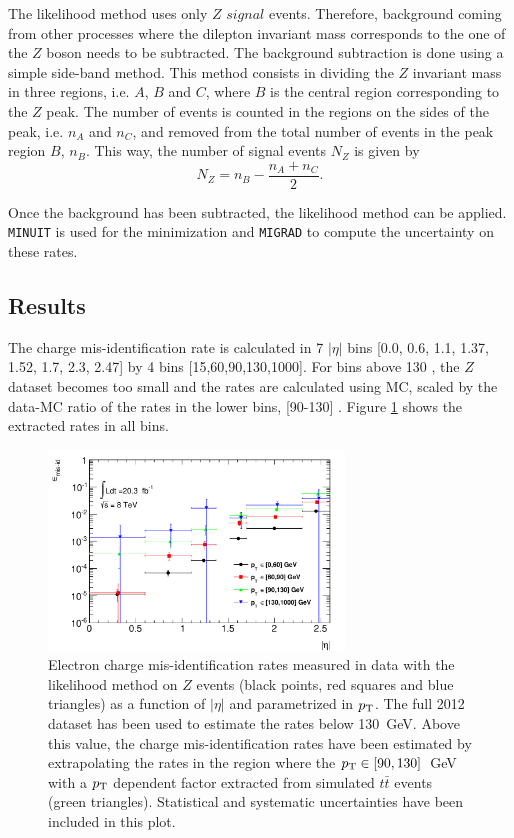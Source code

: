 The likelihood method uses only $Z$ $signal$ events. Therefore, background coming from other processes where the dilepton invariant mass corresponds to the one of the $Z$ boson needs to be subtracted. The background subtraction is done using a simple side-band method.   This method consists in dividing the $Z$ invariant mass in three regions, i.e. $A$, $B$ and $C$, where $B$ is the central region corresponding to the $Z$ peak. The number of events is counted in the regions on the sides of the peak, i.e. $n_A$ and $n_C$, and removed  from the total number of events in the peak region $B$, $n_B$. This way, the number of signal events $N_Z$ is given by
\begin{equation}
N_Z=n_B-\frac{n_A+n_C}{2}.
\end{equation}
  
 Once the background has been subtracted, the likelihood method can be applied. {\tt MINUIT} is used for the minimization and {\tt MIGRAD} to compute the uncertainty on these rates. 


\subsection{Results}

The charge mis-identification rate is calculated in 7 $|\eta|$ bins [0.0, 0.6, 1.1, 1.37, 1.52, 1.7, 2.3, 2.47] by 4 \pt bins [15,60,90,130,1000]. For \pt bins above 130 \gevc, the $Z$ dataset becomes too small and the rates are calculated using \ttbar MC, scaled by the data-MC ratio of the rates in the lower \pt bins, [90-130] \gevc. Figure \ref{figure:background_cf} shows the extracted rates in all bins.

\begin{figure}[ht!]
\centering
\includegraphics[width=0.7\textwidth]{figs/qmis/Rates2D}
  \caption{Electron charge mis-identification rates  measured in data with the likelihood method  on $Z$ events (black points, red squares and blue triangles) as a function of $|\eta|$ and parametrized in $p_{\rm T}$. The full 2012 dataset has been used to estimate the rates below 130~GeV.   Above this value, the charge mis-identification rates have been estimated by extrapolating the rates in the region where the $p_{\rm T}\in[90,130]$~GeV with a $p_{\rm T}$ dependent factor extracted from simulated $t\bar t$ events (green triangles). Statistical and systematic uncertainties  have been included in this plot. \label{figure:background_cf}}
\end{figure}


